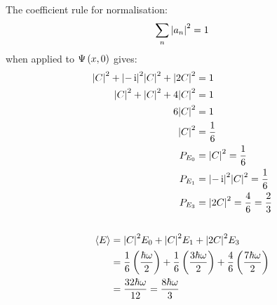 \subsection{}
The coefficient rule for normalisation:
\begin{equation*}
    \sum_n \abs{a_n}^2 = 1
\end{equation*}
when applied to $ \Psi \del{x, 0} $ gives:
\begin{align*}
    \abs{C}^2 + \abs{-\operatorname{i}}^2 \abs{C}^2 + \abs{2C}^2 & = 1\\
    \abs{C}^2 + \abs{C}^2 + 4 \abs{C}^2 & = 1\\
    6 \abs{C}^2 & = 1\\
    \abs{C}^2 & = \frac{1}{6}\\
    P_{E_0} & = \abs{C}^2 = \frac{1}{6}\\
    P_{E_1} & = \abs{-\operatorname{i}}^2 \abs{C}^2 = \frac{1}{6}\\
    P_{E_3} & = \abs{2C}^2 = \frac{4}{6} = \frac{2}{3}
\end{align*}

\subsection{}
\begin{align*}
    \expectationvalue{E} & = \abs{C}^2 E_0 + \abs{C}^2 E_1 + \abs{2C}^2 E_3\\
    & = \frac{1}{6} \del{\frac{\hbar \omega}{2}} + \frac{1}{6} \del{\frac{3 \hbar \omega}{2}} + \frac{4}{6} \del{\frac{7 \hbar \omega}{2}}\\
    & = \frac{32 \hbar \omega}{12} = \frac{8 \hbar \omega}{3}
\end{align*}
